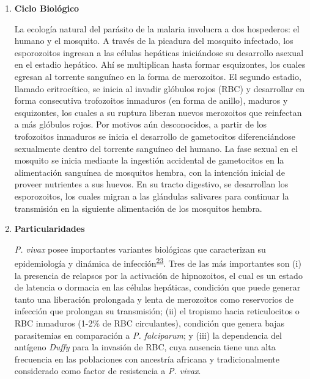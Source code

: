 \documentclass[]{article}
\begin{document}
\begin{enumerate}
  \begin{enumerate}
  \def\labelenumii{\roman{enumii}.}
  \item
    \textbf{Ciclo Biológico}

    La ecología natural del parásito de la malaria involucra a dos
    hospederos: el humano y el mosquito. A través de la picadura del
    mosquito infectado, los esporozoitos ingresan a las células
    hepáticas iniciándose su desarrollo asexual en el estadio hepático.
    Ahí se multiplican hasta formar esquizontes, los cuales egresan al
    torrente sanguíneo en la forma de merozoitos. El segundo estadio,
    llamado eritrocítico, se inicia al invadir glóbulos rojos (RBC) y
    desarrollar en forma consecutiva trofozoitos inmaduros (en forma de
    anillo), maduros y esquizontes, los cuales a su ruptura liberan
    nuevos merozoitos que reinfectan a más glóbulos rojos. Por motivos
    aún desconocidos, a partir de los trofozoitos inmaduros se inicia el
    desarrollo de gametocitos diferenciándose sexualmente dentro del
    torrente sanguíneo del humano. La fase sexual en el mosquito se
    inicia mediante la ingestión accidental de gametocitos en la
    alimentación sanguínea de mosquitos hembra, con la intención inicial
    de proveer nutrientes a sus huevos. En su tracto digestivo, se
    desarrollan los esporozoitos, los cuales migran a las glándulas
    salivares para continuar la transmisión en la siguiente alimentación
    de los mosquitos hembra.
  \item
    \textbf{Particularidades}

    \emph{P. vivax} posee importantes variantes biológicas que
    caracterizan su epidemiología y dinámica de
    infección\textsuperscript{\protect\hyperlink{ref-howes2016global}{23}}.
    Tres de las más importantes son (i) la presencia de relapsos por la
    activación de hipnozoitos, el cual es un estado de latencia o
    dormacia en las células hepáticas, condición que puede generar tanto
    una liberación prolongada y lenta de merozoitos como reservorios de
    infección que prolongan su transmisión; (ii) el tropismo hacia
    reticulocitos o RBC inmaduros (1-2\% de RBC circulantes), condición
    que genera bajas parasitemias en comparación a \emph{P. falciparum};
    y (iii) la dependencia del antígeno \emph{Duffy} para la invasión de
    RBC, cuya ausencia tiene una alta frecuencia en las poblaciones con
    ancestría africana y tradicionalmente considerado como factor de
    resistencia a \emph{P. vivax}.
  \end{enumerate}
\end{enumerate}
\end{document}
